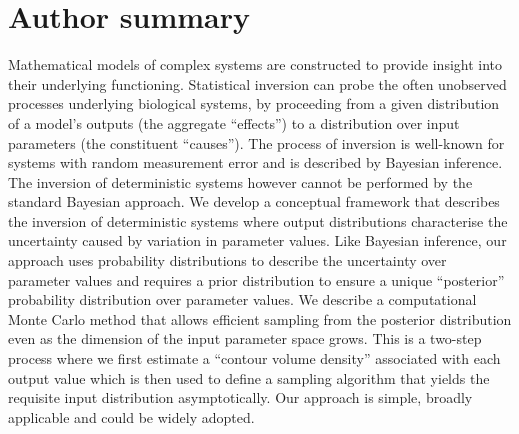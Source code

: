 \documentclass[10pt,letterpaper]{article}
\begin{document}
\section{Author summary}
Mathematical models of complex systems are constructed to provide insight into their underlying functioning. Statistical inversion can probe the often unobserved processes underlying biological systems, by proceeding from a given distribution of a model's outputs (the aggregate ``effects'') to a distribution over input parameters (the constituent ``causes''). The process of inversion is well-known for systems with random measurement error and is described by Bayesian inference. The inversion of deterministic systems however cannot be performed by the standard Bayesian approach. We develop a conceptual framework that describes the inversion of deterministic systems where output distributions characterise the uncertainty caused by variation in parameter values. Like Bayesian inference, our approach uses probability distributions to describe the uncertainty over parameter values and requires a prior distribution to ensure a unique ``posterior'' probability distribution over parameter values. We describe a computational Monte Carlo method that allows efficient sampling from the posterior distribution even as the dimension of the input parameter space grows. This is a two-step process where we first estimate a ``contour volume density'' associated with each output value which is then used to define a sampling algorithm that yields the requisite input distribution asymptotically. Our approach is simple, broadly applicable and could be widely adopted.

\linenumbers


\end{document}
